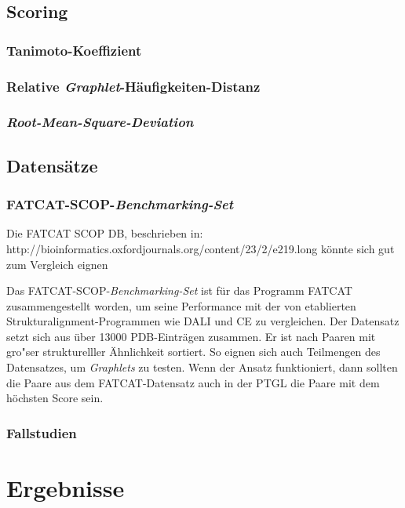 \documentclass{report}
\begin{document}
\section{Scoring}



\subsection{Tanimoto-Koeffizient}

\subsection{Relative \textit{Graphlet}-H\"aufigkeiten-Distanz}

\subsection{\textit{Root-Mean-Square-Deviation}}




\section{Datens\"atze}


\subsection{FATCAT-SCOP-\textit{Benchmarking-Set}}

Die FATCAT SCOP DB, beschrieben in: http://bioinformatics.oxfordjournals.org/content/23/2/e219.long
k\"onnte sich gut zum Vergleich eignen

Das FATCAT-SCOP-\textit{Benchmarking-Set} ist f\"ur das Programm FATCAT zusammengestellt worden, um seine Performance mit der von etablierten Strukturalignment-Programmen wie DALI und CE zu vergleichen. Der Datensatz setzt sich aus \"uber 13000 PDB-Eintr\"agen zusammen. Er ist nach Paaren mit gro"ser strukturelller \"Ahnlichkeit sortiert. So eignen sich auch Teilmengen des Datensatzes, um \textit{Graphlets} zu testen. Wenn der Ansatz funktioniert, dann sollten die Paare aus dem FATCAT-Datensatz auch in der PTGL die Paare mit dem h\"ochsten Score sein.


\subsection{Fallstudien}

\chapter{Ergebnisse}
\end{document}
